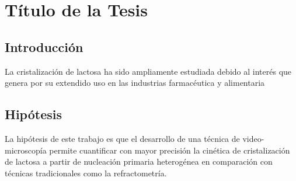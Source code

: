 \section*{Título de la Tesis}

\subsection*{Introducción}


La cristalización de lactosa ha sido ampliamente estudiada debido al interés que genera por su extendido uso en las industrias farmacéutica y alimentaria\cite{haase1966kinetic}


\subsection*{Hipótesis}

La hipótesis de este trabajo es que el desarrollo de una técnica de video-microscopía permite cuantificar con mayor precisión la cinética de cristalización de lactosa a partir de nucleación primaria heterogénea en comparación con técnicas tradicionales como la refractometría.








